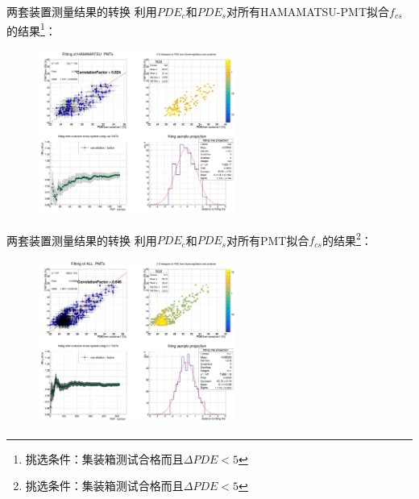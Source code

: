 \documentclass[11pt,compress,xcolor=x11names,UTF8]{beamer}
\begin{document}
\begin{frame}{两套装置测量结果的转换}
利用$PDE_c$和$PDE_s$对所有HAMAMATSU-PMT拟合$f_{cs}$的结果\footnote{挑选条件：集装箱测试合格而且$\Delta PDE<5$}：
\begin{figure}
\centering
\includegraphics[width=0.58\textwidth]{fit_hmp_noint}
\end{figure}
\end{frame}
\begin{frame}{两套装置测量结果的转换}
利用$PDE_c$和$PDE_s$对所有PMT拟合$f_{cs}$的结果\footnote{挑选条件：集装箱测试合格而且$\Delta PDE<5$}：
\begin{figure}
\centering
\includegraphics[width=0.58\textwidth]{fit_all_pmts}
\end{figure}
\end{frame}
\end{document}
